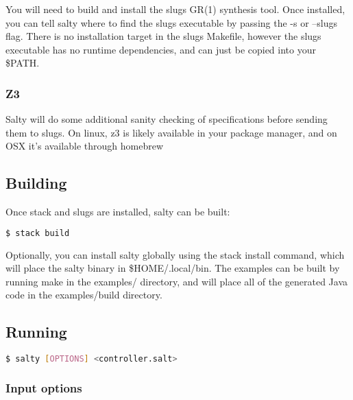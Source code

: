 You will need to build and install the slugs GR(1) synthesis tool. Once installed, you can tell salty where to find the slugs executable by passing the -s or --slugs flag. There is no installation target in the slugs Makefile, however the slugs executable has no runtime dependencies, and can just be copied into your \$PATH.

\subsubsection{Z3}

Salty will do some additional sanity checking of specifications before sending them to slugs. On linux, z3 is likely available in your package manager, and on OSX it's available through homebrew

\subsection{Building}

Once stack and slugs are installed, salty can be built:

\begin{lstlisting}[language=bash]
$ stack build
\end{lstlisting}
Optionally, you can install salty globally using the stack install command, which will place the salty binary in \$HOME/.local/bin.
The examples can be built by running make in the examples/ directory, and will place all of the generated Java code in the examples/build directory.

\subsection{Running}
\begin{lstlisting}[language=bash]
$ salty [OPTIONS] <controller.salt>
\end{lstlisting}

\subsubsection{Input options}

